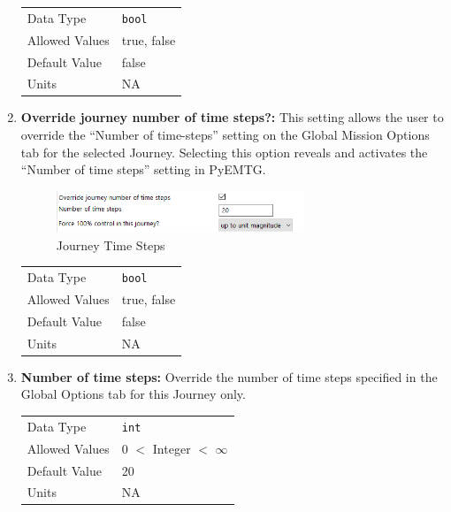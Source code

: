 \begin{enumerate}
        \begin{table}[H]
            \hspace{2cm}
            \begin{tabular}{ll}
            Data Type & \verb|bool| \\
            Allowed Values & true, false \\
            Default Value & false \\
            Units & NA
            \end{tabular}
        \end{table}

    \item \textbf{Override journey number of time steps?:} This setting allows the user to override the ``Number of time-steps'' setting on the Global Mission Options tab for the selected Journey. Selecting this option reveals and activates the ``Number of time steps'' setting in PyEMTG.
        
        \begin{figure}[H]
            \centering
            \includegraphics[width=0.7\textwidth]{../../shared_latex_inputs/images/pyemtg_journey_timesteps.png}
            \caption{Journey Time Steps}
            \label{fig:pyemtg_journey_timesteps}
        \end{figure}
    

        \begin{table}[H]
            \hspace{2cm}
            \begin{tabular}{ll}
            Data Type & \verb|bool| \\
            Allowed Values & true, false \\
            Default Value & false \\
            Units & NA
            \end{tabular}
        \end{table}

        \item \textbf{Number of time steps:} Override the number of time steps specified in the Global Options tab for this Journey only.

            \begin{table}[H]
                \hspace{2cm}
                \begin{tabular}{ll}
                Data Type & \verb|int| \\
                Allowed Values & 0 $<$ Integer $<$ $\infty$ \\
                Default Value & 20 \\
                Units & NA
                \end{tabular}
            \end{table}


\end{enumerate}
